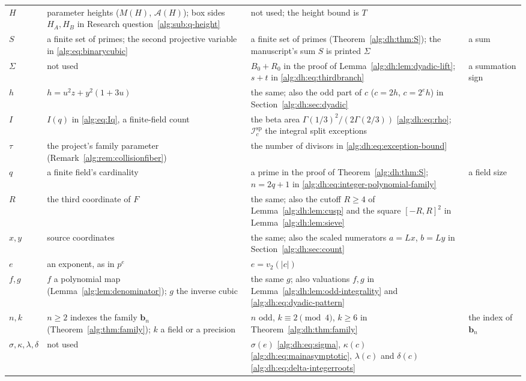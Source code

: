 \documentclass[11pt]{article}
\numberwithin{equation}{section}
\theoremstyle{plain}
\theoremstyle{plain}
\theoremstyle{plain}
\theoremstyle{definition}
\theoremstyle{definition}
\theoremstyle{definition}
\theoremstyle{remark}
\newcommand{\target}{\boldsymbol b}
\newcommand{\Isplit}{\mathcal I^{\mathrm{sp}}}
\begin{document}
\begin{longtable}{@{}>{\raggedright}p{}>{\raggedright}p{}>{\raggedright}p{}>{\raggedright\arraybackslash}p{}@{}}
$H$ & parameter heights ($M(H)$, $\mathcal A(H)$); box sides $H_A,H_B$ in
Research question~\ref{alg:sub:q-height} & not used; the height bound is
$T$ & \\
$S$ & a finite set of primes; the second projective variable in
\eqref{alg:eq:binarycubic} & a finite set of primes
(Theorem~\ref{alg:dh:thm:S}); the manuscript's sum $S$ is printed
$\Sigma$ & a sum\\
$\Sigma$ & not used & $B_0+R_0$ in the proof of
Lemma~\ref{alg:dh:lem:dyadic-lift}; $s+t$ in
\eqref{alg:dh:eq:thirdbranch} & a summation sign\\
$h$ & $h=u^2z+y^2(1+3u)$ & the same; also the odd part of $c$
($c=2h$, $c=2^eh$) in Section~\ref{alg:dh:sec:dyadic} & \\
$I$ & $I(q)$ in \eqref{alg:eq:Iq}, a finite-field count & the beta area
$\Gamma(1/3)^2/(2\Gamma(2/3))$ \eqref{alg:dh:eq:rho}; $\Isplit_c$ the
integral split exceptions & \\
$\tau$ & the project's family parameter
(Remark~\ref{alg:rem:collisionfiber}) & the number of divisors in
\eqref{alg:dh:eq:exception-bound} & \\
$q$ & a finite field's cardinality & a prime in the proof of
Theorem~\ref{alg:dh:thm:S}; $n=2q+1$ in
\eqref{alg:dh:eq:integer-polynomial-family} & a field size\\
$R$ & the third coordinate of $F$ & the same; also the cutoff $R\ge4$ of
Lemma~\ref{alg:dh:lem:cusp} and the square $[-R,R]^2$ in
Lemma~\ref{alg:dh:lem:sieve} & \\
$x,y$ & source coordinates & the same; also the scaled numerators
$a=Lx$, $b=Ly$ in Section~\ref{alg:dh:sec:count} & \\
$e$ & an exponent, as in $p^e$ & $e=v_2(|c|)$ & \\
$f,g$ & $f$ a polynomial map (Lemma~\ref{alg:lem:denominator}); $g$ the
inverse cubic & the same $g$; also valuations $f,g$ in
Lemma~\ref{alg:dh:lem:odd-integrality} and
\eqref{alg:dh:eq:dyadic-pattern} & \\
$n,k$ & $n\ge2$ indexes the family $\target_n$
(Theorem~\ref{alg:thm:family}); $k$ a field or a precision & $n$ odd,
$k\equiv2\pmod4$, $k\ge6$ in Theorem~\ref{alg:dh:thm:family} & the
index of $\target_n$\\
$\sigma,\kappa,\lambda,\delta$ & not used & $\sigma(e)$
\eqref{alg:dh:eq:sigma}, $\kappa(c)$ \eqref{alg:dh:eq:mainasymptotic},
$\lambda(c)$ and $\delta(c)$ \eqref{alg:dh:eq:delta-integerroots} & \\
\end{longtable}
\endgroup
\end{document}
